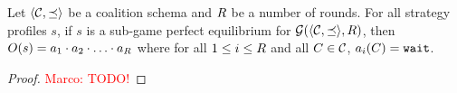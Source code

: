 \begin{theorem}
Let $\langle \mathcal{C}, \preceq \rangle$ be a coalition schema and $R$ be a number of rounds.
%
For all strategy profiles $s$, 
%
if $s$ is a sub-game perfect equilibrium for $\mathcal{G}(\langle \mathcal{C}, \preceq \rangle, R)$, then
%
$O(s) = a_1 \cdot a_2 \cdot \ldots \cdot a_{R}$ where for all $1 \leq i \leq R$ and all $C \in \mathcal{C}$, $a_i(C) = \mathtt{wait}$.
\end{theorem}

\begin{proof}
\textcolor{red}{Marco: TODO!}	
\end{proof}





\begin{comment}
\para{Whistleblowing choices}
%
A whistleblowing choice $w$ for a coalition $C$ is a function $w : C \to 2^{\shareholder}$ such that $w(C) = C'$ such that $C' \subseteq C$.

\para{Ordering}
%
An ordering $O$ for a coalition $C$ is a permutation of $C$.

\para{Strategies}
%
A strategy $s$ for a coalition $C$ is a function $s : \{1, \ldots, |C|\} \to \{ wShare, wSecret, wait\}$.
%
We denote by $honest$ the strategy picking the action $wait$ for all  $i$.


\para{Valid strategies}
%
A strategy $s$ is valid for a coalition $C$, an ordering $O$, and a $w$ if the following conditions are satisfied:
%
\begin{compactitem}
\item Whenever $s(i) = wSecret$, then $|O[i] \cup \bigcup_{j < i} ( w(O[j]) \cap \{ h \in \shareholder \mid s(j) = wShare \}	)| \geq k$.
\item Whenever $s(i) = wSecret$, then $|w(O[i]) \cup \bigcup_{j < i} ( w(O[j]) \cap \{ h \in \shareholder \mid s(j) = wShare \}	)| \leq k-1$.
\item Whenever $s(i) = wSecret$, then for all $j \neq i$, $s(j) \neq wSecret$.
\item Whenever $s(i) = wSecret$, then for all $j > i$, $s(j) = wait$.
\item Whenever $s(i) = wShare$, then $|w(O[i]) \cup \bigcup_{j < i} ( w(O[j]) \cap \{ h \in \shareholder \mid s(j) = wShare \}	)| \leq k$.
\item Whenever $s(i) = wShare$, if $|w(O[i]) \cup \bigcup_{j < i} ( w(O[j]) \cap \{ h \in \shareholder \mid s(j) = wShare \}	)| = k$, then for all $j > i$, $s(j) = wait$.
\end{compactitem}




\end{comment}
